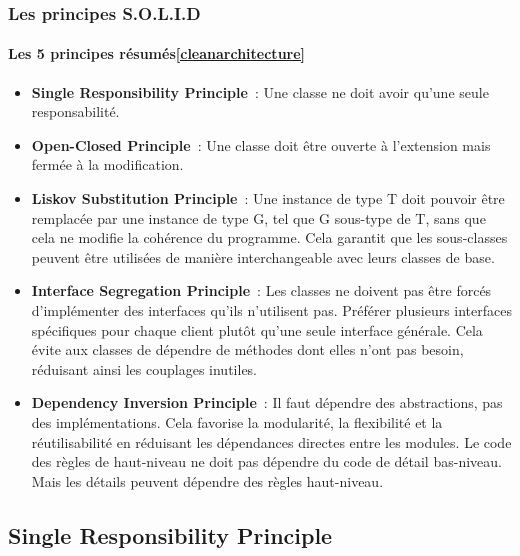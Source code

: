 \documentclass{beamer}
\begin{document}
    \begin{frame}
        \transdissolve
        \frametitle{Les principes S.O.L.I.D}
        \framesubtitle{Les 5 principes résumés\cref{cleanarchitecture}}
        \begin{footnotesize}
            \begin{itemize}
                \item \textbf{Single Responsibility Principle}~: Une classe ne doit avoir qu'une seule responsabilité.
                \item \textbf{Open-Closed Principle}~: Une classe doit être ouverte à l'extension mais fermée à la modification.
                \item \textbf{Liskov Substitution Principle}~: Une instance de type T doit pouvoir être remplacée par une instance de type G, tel que G sous-type de T, sans que cela ne modifie la cohérence du programme.
                Cela garantit que les sous-classes peuvent être utilisées de manière interchangeable avec leurs classes de base.
                \item \textbf{Interface Segregation Principle}~: Les classes ne doivent pas être forcés d'implémenter des interfaces qu'ils n'utilisent pas.
                Préférer plusieurs interfaces spécifiques pour chaque client plutôt qu'une seule interface générale.
                Cela évite aux classes de dépendre de méthodes dont elles n'ont pas besoin, réduisant ainsi les couplages inutiles.
                \item \textbf{Dependency Inversion Principle}~: Il faut dépendre des abstractions, pas des implémentations.
                Cela favorise la modularité, la flexibilité et la réutilisabilité en réduisant les dépendances directes entre les modules.
                Le code des règles de haut-niveau ne doit pas dépendre du code de détail bas-niveau.
                Mais les détails peuvent dépendre des règles haut-niveau.
            \end{itemize}
        \end{footnotesize}
    \end{frame}

    \subsection{Single Responsibility Principle}\label{subsec:mid-level-s}
\end{document}

